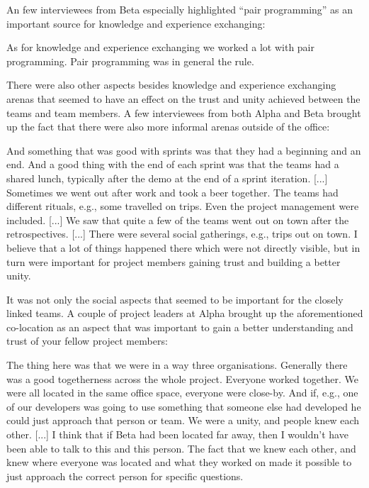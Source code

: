 An few interviewees from Beta especially highlighted ``pair programming'' as an important source for knowledge and experience exchanging:

\begin{fancyquotes}
As for knowledge and experience exchanging we worked a lot with pair programming. Pair programming was in general the rule.
\end{fancyquotes}

There were also other aspects besides knowledge and experience exchanging arenas that seemed to have an effect on the trust and unity achieved between the teams and team members. A few interviewees from both Alpha and Beta brought up the fact that there were also more informal arenas outside of the office:

\begin{fancyquotes}
And something that was good with sprints was that they had a beginning and an end. And a good thing with the end of each sprint was that the teams had a shared lunch, typically after the demo at the end of a sprint iteration. [...] Sometimes we went out after work and took a beer together. The teams had different rituals, e.g., some travelled on trips. Even the project management were included. [...] We saw that quite a few of the teams went out on town after the retrospectives. [...] There were several social gatherings, e.g., trips out on town. I believe that a lot of things happened there which were not directly visible, but in turn were important for project members gaining trust and building a better unity.
\end{fancyquotes}

It was not only the social aspects that seemed to be important for the closely linked teams. A couple of project leaders at Alpha brought up the aforementioned co-location as an aspect that was important to gain a better understanding and trust of your fellow project members:

\begin{fancyquotes}
The thing here was that we were in a way three organisations. Generally there was a good togetherness across the whole project. Everyone worked together. We were all located in the same office space, everyone were close-by. And if, e.g., one of our developers was going to use something that someone else had developed he could just approach that person or team. We were a unity, and people knew each other. [...] I think that if Beta had been located far away, then I wouldn't have been able to talk to this and this person. The fact that we knew each other, and knew where everyone was located and what they worked on made it possible to just approach the correct person for specific questions.
\end{fancyquotes}

